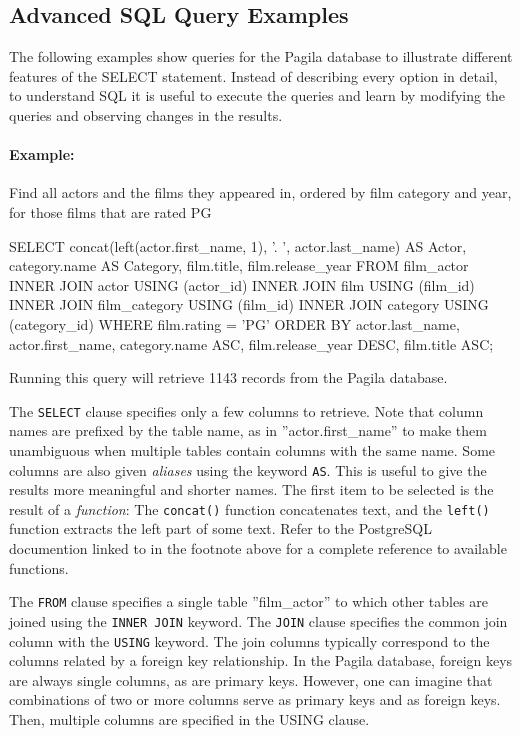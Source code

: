 \subsection*{Advanced SQL Query Examples}

The following examples show queries for the Pagila database to illustrate different features of the SELECT statement. Instead of describing every option in detail, to understand SQL it is useful to execute the queries and learn by modifying the queries and observing changes in the results. 

\paragraph{Example:} Find all actors and the films they appeared in, ordered by film category and year, for those films that are rated PG

\begin{samepage}
\begin{sqlcode}
SELECT concat(left(actor.first_name, 1), '. ', 
           actor.last_name) AS Actor, 
       category.name AS Category, 
       film.title, 
       film.release_year
  FROM film_actor
  INNER JOIN actor USING (actor_id)
  INNER JOIN film USING (film_id)
  INNER JOIN film_category USING (film_id)
  INNER JOIN category USING (category_id)
  WHERE film.rating = 'PG'
  ORDER BY actor.last_name, 
           actor.first_name, 
           category.name ASC, 
           film.release_year DESC, 
           film.title ASC;
\end{sqlcode}
\end{samepage}

Running this query will retrieve 1143 records from the Pagila database. 

The \texttt{SELECT} clause specifies only a few columns to retrieve. Note that column names are prefixed by the table name, as in ''actor.first\_name'' to make them unambiguous when multiple tables contain columns with the same name. Some columns are also given \emph{aliases} using the keyword \texttt{AS}. This is useful to give the results more meaningful and shorter names. The first item to be selected is the result of a \emph{function}: The \texttt{concat()} function concatenates text, and the \texttt{left()} function extracts the left part of some text. Refer to the PostgreSQL documention linked to in the footnote above for a complete reference to available functions. 

The \texttt{FROM} clause specifies a single table ''film\_actor'' to which other tables are joined using the \texttt{INNER JOIN} keyword. The \texttt{JOIN} clause specifies the common join column with the \texttt{USING} keyword. The join columns typically correspond to the columns related by a foreign key relationship. In the Pagila database, foreign keys are always single columns, as are primary keys. However, one can imagine that combinations of two or more columns serve as primary keys and as foreign keys. Then, multiple columns are specified in the USING clause.

